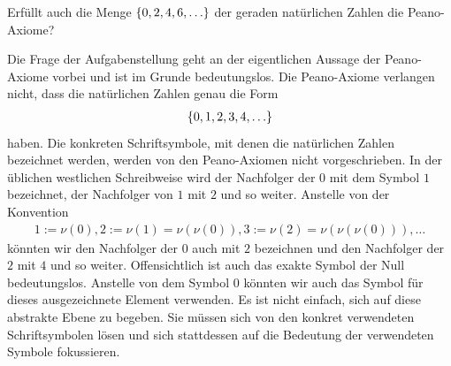 \begin{mychallenge}\label{mychallenge:0106}
	Erfüllt auch die Menge $\left\{0,2,4,6,\ldots\right\}$  der geraden natürlichen Zahlen die Peano-Axiome?
	\begin{myanswer}
		Die Frage der Aufgabenstellung geht an der eigentlichen Aussage der Peano-Axiome vorbei und ist im Grunde bedeutungslos.
		Die Peano-Axiome verlangen nicht, dass die natürlichen Zahlen genau die Form
		\begin{align*}
			\left\{0,1,2,3,4,\ldots\right\}
		\end{align*}
		haben.
		Die konkreten Schriftsymbole, mit denen die natürlichen Zahlen bezeichnet werden, werden von den Peano-Axiomen nicht vorgeschrieben.
		In der üblichen westlichen Schreibweise wird der Nachfolger der $0$ mit dem Symbol $1$ bezeichnet, der Nachfolger von $1$ mit $2$ und so weiter.
		Anstelle von der Konvention
		\begin{align*}
			1:=\nu(0), 2:=\nu(1)=\nu(\nu(0)), 3:=\nu(2)=\nu(\nu(\nu(0))), \ldots
		\end{align*}
		könnten wir den Nachfolger der $0$ auch mit $2$ bezeichnen und den Nachfolger der $2$ mit $4$ und so weiter.
		Offensichtlich ist auch das exakte Symbol der Null bedeutungslos.
		Anstelle von dem Symbol $0$ könnten wir auch das Symbol  für dieses ausgezeichnete Element verwenden.
		Es ist nicht einfach, sich auf diese abstrakte Ebene zu begeben.
		Sie müssen sich von den konkret verwendeten Schriftsymbolen lösen und sich stattdessen auf die Bedeutung der verwendeten Symbole fokussieren.
	\end{myanswer}
\end{mychallenge}

